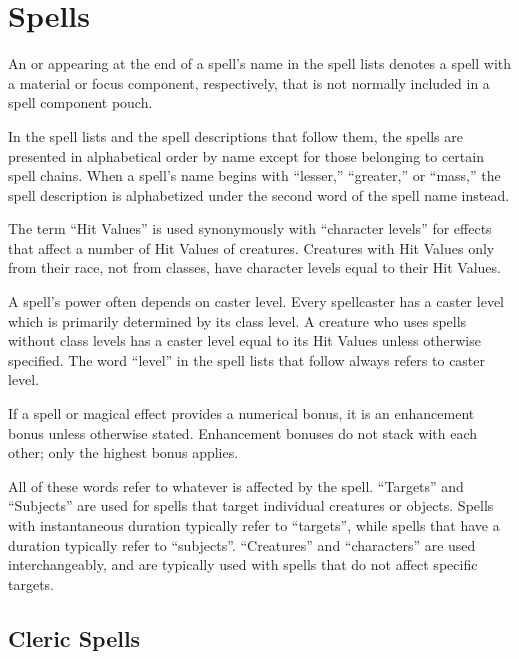 \chapter{Spells}

An \M{} or \F{} appearing at the end of a spell's name in the spell lists denotes a spell with a material or focus component, respectively, that is not normally included in a spell component pouch.

 In the spell lists and the spell descriptions that follow them, the spells are presented in alphabetical order by name except for those belonging to certain spell chains.
When a spell's name begins with ``lesser,'' ``greater,'' or ``mass,'' the spell description is alphabetized under the second word of the spell name instead.

 The term ``Hit Values'' is used synonymously with ``character levels'' for effects that affect a number of Hit Values of creatures. Creatures with Hit Values only from their race, not from classes, have character levels equal to their Hit Values.

 A spell's power often depends on caster level. Every spellcaster has a caster level which is primarily determined by its class level. A creature who uses spells without class levels has a caster level equal to its Hit Values unless otherwise specified. The word ``level'' in the spell lists that follow always refers to caster level.

 If a spell or magical effect provides a numerical bonus, it is an enhancement bonus unless otherwise stated. Enhancement bonuses do not stack with each other; only the highest bonus applies.

 All of these words refer to whatever is affected by the spell. ``Targets'' and ``Subjects'' are used for spells that target individual creatures or objects. Spells with instantaneous duration typically refer to ``targets'', while spells that have a duration typically refer to ``subjects''. ``Creatures'' and ``characters'' are used interchangeably, and are typically used with spells that do not affect specific targets.

\small

\section{Cleric Spells}\label{Cleric Spells}

